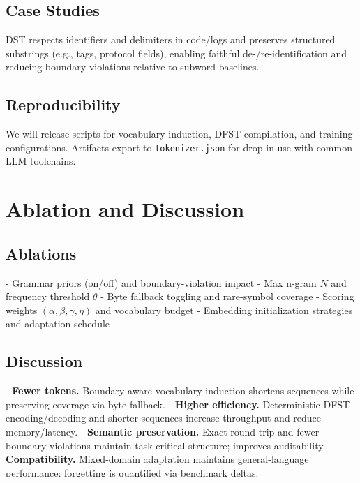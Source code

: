 \subsection{Case Studies}

DST respects identifiers and delimiters in code/logs and preserves structured substrings (e.g., tags, protocol fields), enabling faithful de-/re-identification and reducing boundary violations relative to subword baselines.

\subsection{Reproducibility}

We will release scripts for vocabulary induction, DFST compilation, and training configurations. Artifacts export to \texttt{tokenizer.json} for drop-in use with common LLM toolchains.

\section{Ablation and Discussion}
\label{sec:ablation}

\subsection{Ablations}

- Grammar priors (on/off) and boundary-violation impact
- Max n-gram $N$ and frequency threshold $\theta$
- Byte fallback toggling and rare-symbol coverage
- Scoring weights $(\alpha,\beta,\gamma,\eta)$ and vocabulary budget
- Embedding initialization strategies and adaptation schedule

\subsection{Discussion}

- \textbf{Fewer tokens.} Boundary-aware vocabulary induction shortens sequences while preserving coverage via byte fallback.
- \textbf{Higher efficiency.} Deterministic DFST encoding/decoding and shorter sequences increase throughput and reduce memory/latency.
- \textbf{Semantic preservation.} Exact round-trip and fewer boundary violations maintain task-critical structure; improves auditability.
- \textbf{Compatibility.} Mixed-domain adaptation maintains general-language performance; forgetting is quantified via benchmark deltas.

\section{Conclusion and Future Work}
\label{sec:conclusion}

